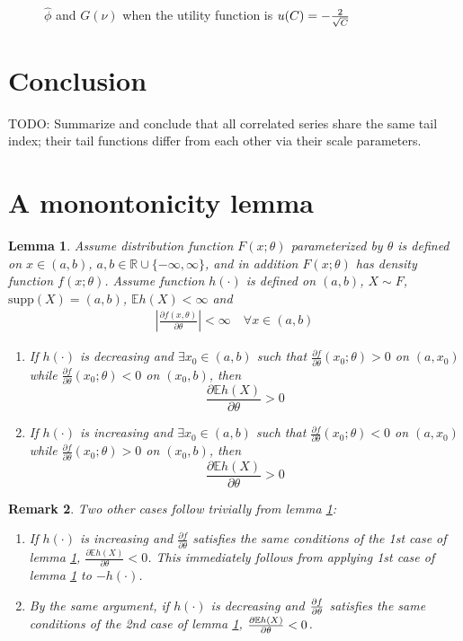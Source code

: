 \documentclass[11pt,a4]{amsart}
\newcommand{\pd}{\partial}
\newtheorem{lemma}{Lemma}[section]
\newtheorem{remark}[lemma]{Remark}
\newcommand{\E }{{\mathbb E}}
\newcommand{\1}{{\mathbf 1}}
\begin{document}
\begin{figure}[htb!]
\begin{minipage}{0.5\linewidth}
  \end{minipage}
  \caption{$\hat\phi$ and $G(\nu)$ when the utility
    function is $u(C) = -{2 \over \sqrt{C}}$
  }
  \label{fig:phi_hat_U_power}
\end{figure}

\section{Conclusion}
\label{sec:4}
TODO: Summarize and conclude that all correlated series share the same
tail index; their tail functions differ from each other via their
scale parameters.

\appendix
\section{A monontonicity lemma}
\begin{lemma} \label{lemma:I}
  Assume distribution function $F(x; \theta)$ parameterized by
  $\theta$ is defined on $x \in (a, b)$, $a, b \in \mathbb R \cup
  \{-\infty, \infty\}$, and in addition $F(x; \theta)$ has density
  function $f(x; \theta)$. Assume function $h(\cdot)$ is defined on
  $(a, b)$, $X \sim F$, $\text{supp}(X) = (a,b)$,
  $\E h(X) < \infty$ and
  \begin{eqnarray*}
    \left| \frac{\pd f(x, \theta)}{\pd \theta} \right| < \infty
    \quad \forall x \in (a, b)
  \end{eqnarray*}
  \begin{enumerate}
  \item If $h(\cdot)$ is decreasing and $\exists x_0 \in (a, b)$ such that
    $\frac{\pd f}{\pd \theta}(x_0; \theta) > 0$ on $(a, x_0)$ while
    $\frac{\pd f}{\pd \theta}(x_0; \theta) < 0$ on $(x_0, b)$, then
    \[
    \frac{\pd \E h(X)}{\pd \theta} > 0
    \]
  \item If $h(\cdot)$ is increasing and $\exists x_0 \in (a, b)$ such that 
    $\frac{\pd f}{\pd \theta}(x_0; \theta) < 0$ on $(a, x_0)$  while
    $\frac{\pd f}{\pd \theta}(x_0; \theta) > 0$ on $(x_0, b)$, then
    \[
    \frac{\pd \E h(X)}{\pd \theta} > 0
    \]
  \end{enumerate}
\end{lemma}
\begin{remark}
  \label{remark:I}
  Two other cases follow trivially from lemma \ref{lemma:I}:
  \begin{enumerate}
  \item If $h(\cdot)$ is increasing and $\frac{\pd f}{\pd \theta}$
    satisfies the
    same conditions of the 1st case of lemma \ref{lemma:I},
    $\frac{\pd \E h(X)}{\pd \theta} < 0$. This immediately follows
    from applying 1st case of lemma \ref{lemma:I} to $-h(\cdot)$.
  \item By the same argument, if $h(\cdot)$ is decreasing and
    ${\pd f \over \pd \theta}$ satisfies the same conditions of the
    2nd case of lemma \ref{lemma:I}, ${\pd \E h(X) \over \pd \theta} < 0$.
  \end{enumerate}
\end{remark}
\end{document}
